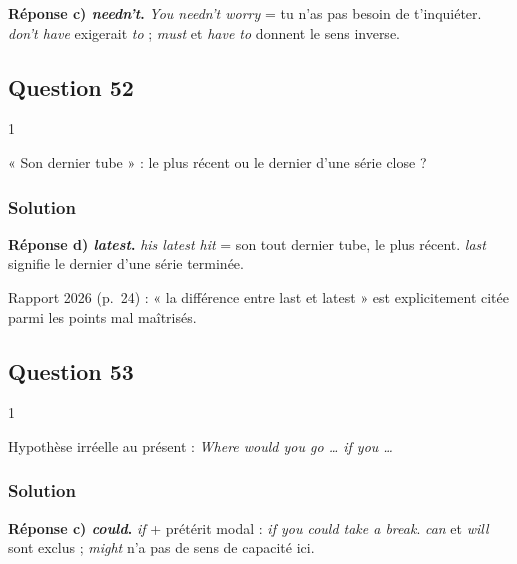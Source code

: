 \documentclass[11pt,a4paper]{article}
\begin{document}
\textbf{Réponse c) \emph{needn't}.} \emph{You needn't worry} = tu n'as pas besoin de t'inquiéter. \emph{don't have} exigerait \emph{to} ; \emph{must} et \emph{have to} donnent le sens inverse.

\hypertarget{question-52}{%
\subsection{Question 52}\label{question-52}}

\begin{indication}{1}

« Son dernier tube » : le plus récent ou le dernier d'une série close ?

\end{indication}

\hypertarget{solution-51}{%
\subsubsection{Solution}\label{solution-51}}

\textbf{Réponse d) \emph{latest}.} \emph{his latest hit} = son tout dernier tube, le plus récent. \emph{last} signifie le dernier d'une série terminée.

\begin{jury}

Rapport 2026 (p.~24) : « la différence entre last et latest » est explicitement citée parmi les points mal maîtrisés.

\end{jury}

\hypertarget{question-53}{%
\subsection{Question 53}\label{question-53}}

\begin{indication}{1}

Hypothèse irréelle au présent : \emph{Where would you go \ldots{} if you \ldots{}}

\end{indication}

\hypertarget{solution-52}{%
\subsubsection{Solution}\label{solution-52}}

\textbf{Réponse c) \emph{could}.} \emph{if} + prétérit modal : \emph{if you could take a break}. \emph{can} et \emph{will} sont exclus ; \emph{might} n'a pas de sens de capacité ici.
\end{document}
